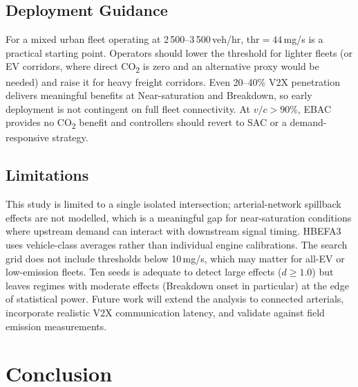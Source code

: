 \documentclass[review,3p,authoryear,times]{elsarticle}
\begin{document}
\subsection{Deployment Guidance}

For a mixed urban fleet operating at 2\,500--3\,500\,veh/hr,
$\text{thr}=44$\,mg/s is a practical starting point. Operators should lower
the threshold for lighter fleets (or EV corridors, where direct
CO\textsubscript{2} is zero and an alternative proxy would be needed) and
raise it for heavy freight corridors. Even 20--40\% V2X penetration delivers
meaningful benefits at Near-saturation and Breakdown, so early deployment is
not contingent on full fleet connectivity. At $v/c>90\%$, EBAC provides no
CO\textsubscript{2} benefit and controllers should revert to SAC or a
demand-responsive strategy.

\subsection{Limitations}

This study is limited to a single isolated intersection; arterial-network
spillback effects are not modelled, which is a meaningful gap for
near-saturation conditions where upstream demand can interact with downstream
signal timing. HBEFA3 uses vehicle-class averages rather than individual
engine calibrations. The search grid does not include thresholds below
10\,mg/s, which may matter for all-EV or low-emission fleets. Ten seeds is
adequate to detect large effects ($d\geq 1.0$) but leaves regimes with
moderate effects (Breakdown onset in particular) at the edge of statistical
power. Future work will extend the analysis to connected arterials,
incorporate realistic V2X communication latency, and validate against field
emission measurements.

\section{Conclusion}
\label{sec:conclude}
\end{document}
